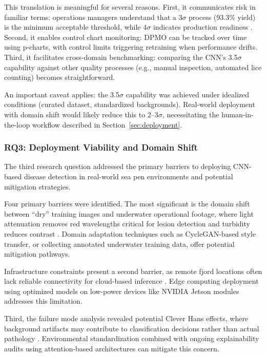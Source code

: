 \documentclass[12pt,a4paper]{article}
\begin{document}
This translation is meaningful for several reasons. First, it communicates risk in familiar terms: operations managers understand that a 3$\sigma$ process (93.3\% yield) is the minimum acceptable threshold, while 4$\sigma$ indicates production readiness \citep{Tsung2023}. Second, it enables control chart monitoring: DPMO can be tracked over time using p-charts, with control limits triggering retraining when performance drifts. Third, it facilitates cross-domain benchmarking: comparing the CNN's 3.5$\sigma$ capability against other quality processes (e.g., manual inspection, automated lice counting) becomes straightforward.

An important caveat applies: the 3.5$\sigma$ capability was achieved under idealized conditions (curated dataset, standardized backgrounds). Real-world deployment with domain shift would likely reduce this to 2--3$\sigma$, necessitating the human-in-the-loop workflow described in Section~\ref{sec:deployment}.

\subsubsection{RQ3: Deployment Viability and Domain Shift}
The third research question addressed the primary barriers to deploying CNN-based disease detection in real-world sea pen environments and potential mitigation strategies.

Four primary barriers were identified. The most significant is the domain shift between ``dry'' training images and underwater operational footage, where light attenuation removes red wavelengths critical for lesion detection and turbidity reduces contrast \citep{10048777, JIAN2021116088}. Domain adaptation techniques such as CycleGAN-based style transfer, or collecting annotated underwater training data, offer potential mitigation pathways.

Infrastructure constraints present a second barrier, as remote fjord locations often lack reliable connectivity for cloud-based inference \citep{BIAZI2023102360}. Edge computing deployment using optimized models on low-power devices like NVIDIA Jetson modules addresses this limitation.

Third, the failure mode analysis revealed potential Clever Hans effects, where background artifacts may contribute to classification decisions rather than actual pathology \citep{Lapuschkin2019}. Environmental standardization combined with ongoing explainability audits using attention-based architectures \citep{10138194} can mitigate this concern.
\end{document}
